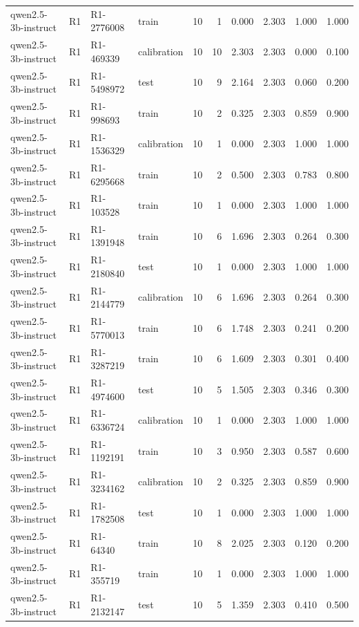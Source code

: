 \begin{table}
\begin{tabular}{llllrrrrrr}
qwen2.5-3b-instruct & R1 & R1-2776008 & train & 10 & 1 & 0.000 & 2.303 & 1.000 & 1.000 \\
qwen2.5-3b-instruct & R1 & R1-469339 & calibration & 10 & 10 & 2.303 & 2.303 & 0.000 & 0.100 \\
qwen2.5-3b-instruct & R1 & R1-5498972 & test & 10 & 9 & 2.164 & 2.303 & 0.060 & 0.200 \\
qwen2.5-3b-instruct & R1 & R1-998693 & train & 10 & 2 & 0.325 & 2.303 & 0.859 & 0.900 \\
qwen2.5-3b-instruct & R1 & R1-1536329 & calibration & 10 & 1 & 0.000 & 2.303 & 1.000 & 1.000 \\
qwen2.5-3b-instruct & R1 & R1-6295668 & train & 10 & 2 & 0.500 & 2.303 & 0.783 & 0.800 \\
qwen2.5-3b-instruct & R1 & R1-103528 & train & 10 & 1 & 0.000 & 2.303 & 1.000 & 1.000 \\
qwen2.5-3b-instruct & R1 & R1-1391948 & train & 10 & 6 & 1.696 & 2.303 & 0.264 & 0.300 \\
qwen2.5-3b-instruct & R1 & R1-2180840 & test & 10 & 1 & 0.000 & 2.303 & 1.000 & 1.000 \\
qwen2.5-3b-instruct & R1 & R1-2144779 & calibration & 10 & 6 & 1.696 & 2.303 & 0.264 & 0.300 \\
qwen2.5-3b-instruct & R1 & R1-5770013 & train & 10 & 6 & 1.748 & 2.303 & 0.241 & 0.200 \\
qwen2.5-3b-instruct & R1 & R1-3287219 & train & 10 & 6 & 1.609 & 2.303 & 0.301 & 0.400 \\
qwen2.5-3b-instruct & R1 & R1-4974600 & test & 10 & 5 & 1.505 & 2.303 & 0.346 & 0.300 \\
qwen2.5-3b-instruct & R1 & R1-6336724 & calibration & 10 & 1 & 0.000 & 2.303 & 1.000 & 1.000 \\
qwen2.5-3b-instruct & R1 & R1-1192191 & train & 10 & 3 & 0.950 & 2.303 & 0.587 & 0.600 \\
qwen2.5-3b-instruct & R1 & R1-3234162 & calibration & 10 & 2 & 0.325 & 2.303 & 0.859 & 0.900 \\
qwen2.5-3b-instruct & R1 & R1-1782508 & test & 10 & 1 & 0.000 & 2.303 & 1.000 & 1.000 \\
qwen2.5-3b-instruct & R1 & R1-64340 & train & 10 & 8 & 2.025 & 2.303 & 0.120 & 0.200 \\
qwen2.5-3b-instruct & R1 & R1-355719 & train & 10 & 1 & 0.000 & 2.303 & 1.000 & 1.000 \\
qwen2.5-3b-instruct & R1 & R1-2132147 & test & 10 & 5 & 1.359 & 2.303 & 0.410 & 0.500 \\

\end{tabular}
\end{table}
